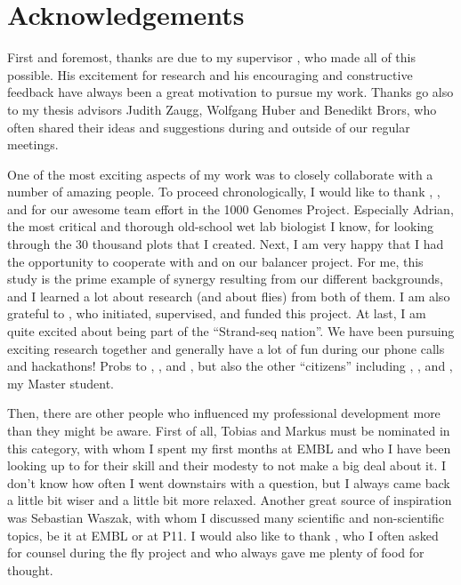\cleardoublepage
{}
\chapter*{Acknowledgements}


First and foremost, thanks are due to my supervisor \jan, who made all of this
possible. His excitement for research and his encouraging and constructive
feedback have always been a great motivation to pursue my work. Thanks go also
to my thesis advisors Judith Zaugg, Wolfgang Huber and Benedikt Brors, who often
shared their ideas and suggestions during and outside of our regular meetings.

One of the most exciting aspects of my work was to closely collaborate with a
number of amazing people. To proceed chronologically, I would like to thank
\tobias, \markus, \andreas and \adrian for our awesome team effort in the
1000 Genomes Project. Especially Adrian, the most critical and thorough
old-school wet lab biologist I know, for looking through the 30 thousand plots
that I created. Next, I am very happy that I had the opportunity to cooperate with \yad and \alek
on our balancer project. For me, this study is the prime example of synergy
resulting from our different backgrounds, and I learned a lot about research
(and about flies) from both of them. I am also grateful to \eileen, who
initiated, supervised, and funded this project. At last, I am quite excited
about being part of the ``Strand-seq nation''. We have been pursuing exciting
research together and generally have a lot of fun during our phone calls and
hackathons! Probs to \ashley, \marschall, \david and \maryam, but also the
other ``citizens'' including \karen, \hyobin, and \venla, my Master student.

Then, there are other people who influenced my professional development more
than they might be aware. First of all, Tobias and Markus must be nominated in
this category, with whom I spent my first months at EMBL and who I have been
looking up to for their skill and their modesty to not make a big deal about it.
I don't know how often I went downstairs with a question, but I always came back
a little bit wiser and a little bit more relaxed. Another great source of
inspiration was Sebastian Waszak, with whom I discussed many scientific and
non-scientific topics, be it at EMBL or at P11. I would also like to thank
\garfield, who I often asked for counsel during the fly project and who always
gave me plenty of food for thought.

